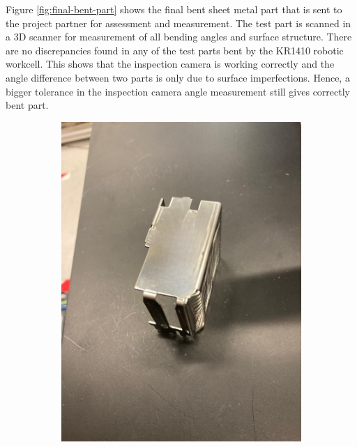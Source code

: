 Figure \ref{fig:final-bent-part} shows the final bent sheet metal part that is sent to the project partner for assessment and measurement. The test part is scanned in a 3D scanner for measurement of all bending angles and surface structure. There are no discrepancies found in any of the test parts bent by the KR1410 robotic workcell. This shows that the inspection camera is working correctly and the angle difference between two parts is only due to surface imperfections. Hence, a bigger tolerance in the inspection camera angle measurement still gives correctly bent part.

\begin{figure}[h]
    \centering
    \begin{subfigure}{0.48\textwidth}
        \centering
        \includegraphics[width=\textwidth]{figures/bending/final-part02.png}
        \caption{}
        \label{subfig:final-part1}
        \vspace{0.5cm}
    \end{subfigure}\hspace{0.25cm}

\end{figure}
